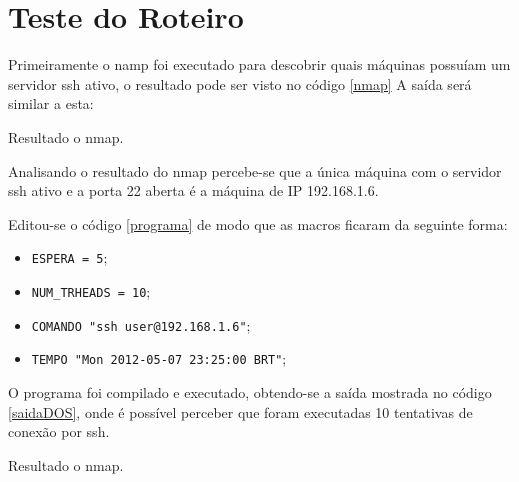 \documentclass[12pt]{abnt}
\begin{document}
\chapter{Teste do Roteiro}
Primeiramente o namp foi executado para descobrir quais máquinas possuíam um servidor
ssh ativo, o resultado pode ser visto no código \ref{nmap}
A saída será similar a esta:

\renewcommand{\baselinestretch}{0.5}  %
\begin{codigo}[!hbt]
   \tiny  %
   \caption{Resultado o nmap.}
   \label{nmap}
\end{codigo}

Analisando o resultado do nmap percebe-se que a única máquina com o servidor
ssh ativo e a porta 22 aberta é a máquina de IP 192.168.1.6.

Editou-se o código \ref{programa} de modo que as macros ficaram da seguinte forma:
\begin{itemize}

	\item \texttt{ESPERA = 5};

	\item \texttt{NUM\_TRHEADS = 10};

	\item \texttt{COMANDO "ssh user@192.168.1.6"};

	\item \texttt{TEMPO "Mon 2012-05-07 23:25:00 BRT"};

\end{itemize}

O programa foi compilado e executado, obtendo-se a saída mostrada no código \ref{saidaDOS},
onde é possível perceber que foram executadas 10 tentativas de conexão por ssh.

\renewcommand{\baselinestretch}{0.5}  %
\begin{codigo}[!htb]
   \tiny  %
   \caption{Resultado o nmap.}
   \label{saidaDOS}
\end{codigo}
\clearpage

\end{document}
